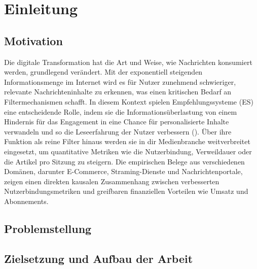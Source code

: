 \section{Einleitung}

\subsection{Motivation}
Die digitale Transformation hat die Art und Weise, wie Nachrichten konsumiert werden, grundlegend verändert. 
Mit der exponentiell steigenden Informationsmenge im Internet wird es für Nutzer zunehmend schwieriger, 
relevante Nachrichteninhalte zu erkennen, was einen kritischen Bedarf an Filtermechanismen schafft. 
In diesem Kontext spielen Empfehlungssysteme (ES) eine entscheidende Rolle, 
indem sie die Informationsüberlastung von einem Hindernis für das Engagement in eine Chance für personalisierte 
Inhalte verwandeln und so die Leseerfahrung der Nutzer verbessern (\cite{wu_personalized_2022}).
\newline
Über ihre Funktion als reine Filter hinaus werden sie in dir Medienbranche weitverbreitet eingesetzt, 
um quantitative Metriken wie die Nutzerbindung, Verweildauer oder die Artikel pro Sitzung zu steigern. 
Die empirischen Belege aus verschiedenen Domänen, darunter E-Commerce, Straming-Dienste
und Nachrichtenportale, zeigen einen direkten kausalen Zusammenhang zwischen verbesserten
Nutzerbindungsmetriken und greifbaren finanziellen Vorteilen wie Umsatz und Abonnements.


\subsection{Problemstellung}

\subsection{Zielsetzung und Aufbau der Arbeit}
